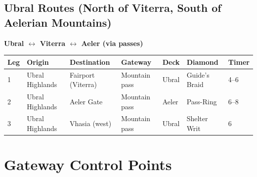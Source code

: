 \documentclass[12pt,oneside]{book}
\begin{document}
\subsection{Ubral Routes (North of Viterra, South of Aelerian Mountains)}

\textbf{Ubral $\leftrightarrow$ Viterra $\leftrightarrow$ Aeler (via passes)}

\begin{longtable}{|p{1.5cm}|p{2.5cm}|p{2.5cm}|p{1.5cm}|p{2cm}|p{1.5cm}|}
\hline
\textbf{Leg} & \textbf{Origin} & \textbf{Destination} & \textbf{Gateway} & \textbf{Deck} & \textbf{Diamond} & \textbf{Timer} \\
 & Ubral Highlands & Fairport (Viterra) & Mountain pass & Ubral & Guide's Braid & 4--6 \\
2 & Ubral Highlands & Aeler Gate & Mountain pass & Aeler & Pass-Ring & 6--8 \\
3 & Ubral Highlands & Vhasia (west) & Mountain pass & Ubral & Shelter Writ & 6 \\
\hline
\end{longtable}

\section{Gateway Control Points}
\end{document}
